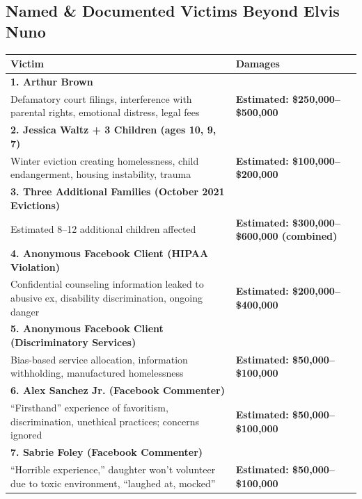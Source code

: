 \documentclass[11pt,letterpaper]{article}
\begin{document}
\subsection{Named \& Documented Victims Beyond Elvis Nuno}

\begin{longtable}{p{2.5in}p{3.5in}}
\toprule
\textbf{Victim} & \textbf{Damages}\\
\midrule
\endhead

\textbf{1. Arthur Brown} & \\
Defamatory court filings, interference with parental rights, emotional distress, legal fees & \textbf{Estimated: \$250,000--\$500,000}\\
\midrule

\textbf{2. Jessica Waltz + 3 Children (ages 10, 9, 7)} & \\
Winter eviction creating homelessness, child endangerment, housing instability, trauma & \textbf{Estimated: \$100,000--\$200,000}\\
\midrule

\textbf{3. Three Additional Families (October 2021 Evictions)} & \\
Estimated 8--12 additional children affected & \textbf{Estimated: \$300,000--\$600,000 (combined)}\\
\midrule

\textbf{4. Anonymous Facebook Client (HIPAA Violation)} & \\
Confidential counseling information leaked to abusive ex, disability discrimination, ongoing danger & \textbf{Estimated: \$200,000--\$400,000}\\
\midrule

\textbf{5. Anonymous Facebook Client (Discriminatory Services)} & \\
Bias-based service allocation, information withholding, manufactured homelessness & \textbf{Estimated: \$50,000--\$100,000}\\
\midrule

\textbf{6. Alex Sanchez Jr. (Facebook Commenter)} & \\
``Firsthand'' experience of favoritism, discrimination, unethical practices; concerns ignored & \textbf{Estimated: \$50,000--\$100,000}\\
\midrule

\textbf{7. Sabrie Foley (Facebook Commenter)} & \\
``Horrible experience,'' daughter won't volunteer due to toxic environment, ``laughed at, mocked'' & \textbf{Estimated: \$50,000--\$100,000}\\
\midrule


\end{longtable}
\end{document}
